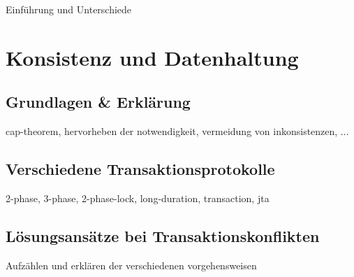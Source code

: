 \documentclass[letterpaper, 12pt]{article}
\let\tempsection\section
\renewcommand\section[1]{\vspace{-0.3cm}\tempsection{#1}\vspace{-0.3cm}}
\let\tempsubsection\subsection
\renewcommand\subsection[1]{\vspace{0cm}\tempsubsection{#1}\vspace{0cm}}
\begin{document}
Einführung und Unterschiede

\clearpage

\section{Konsistenz und Datenhaltung}

\subsection{Grundlagen \& Erklärung}

cap-theorem, hervorheben der notwendigkeit, vermeidung von inkonsistenzen, ...

\subsection{Verschiedene Transaktionsprotokolle}

2-phase, 3-phase, 2-phase-lock, long-duration, transaction, jta

\subsection{Lösungsansätze bei Transaktionskonflikten}

Aufzählen und erklären der verschiedenen vorgehensweisen

\clearpage

\clearpage


\lstlistoflistings
\listoffigures
\end{document}
